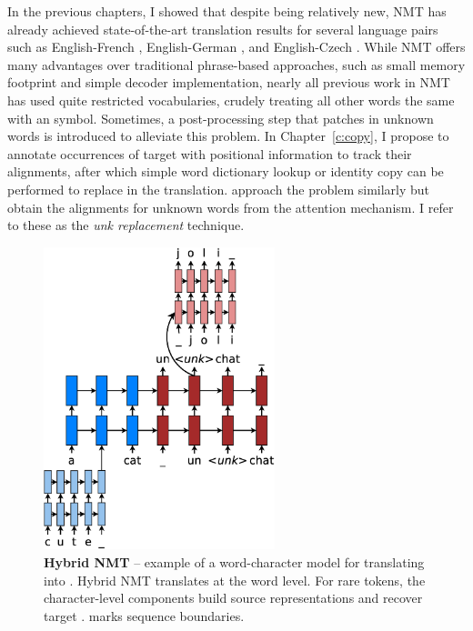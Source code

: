 
\begin{sloppypar}
In the previous chapters, I showed that despite being relatively new, NMT has already
achieved state-of-the-art translation results for several language pairs 
such as English-French \cite{luong15}, English-German
\cite{jean15,luong15attn,luong15iwslt}, and English-Czech \cite{jean15wmt}. 
While NMT offers many advantages over traditional phrase-based approaches, such as
small memory footprint and simple decoder implementation, nearly all previous
work in NMT has used quite restricted vocabularies, crudely treating all other
words the same with an \unk{} symbol. Sometimes, a post-processing step that
patches in unknown words is introduced to alleviate this problem. %
In Chapter~\ref{c:copy}, I propose to annotate occurrences of target \unk{} with positional information to
track their alignments, after which simple word dictionary
lookup or identity copy can be performed to replace \unk{} in the translation.
 approach the problem similarly but obtain the alignments for unknown
words from the attention mechanism. I refer to these as the {\it
unk replacement} technique.
\end{sloppypar}

\begin{figure}%
\centering
\includegraphics[width=0.6\textwidth, clip=true, trim= 0 0 0 0]{img/5-nmt_hybrid}
\caption[Hybrid NMT]{{\bf Hybrid NMT} -- example of a word-character model for translating
 into . Hybrid NMT translates at the word level. For rare tokens,
the character-level components build source representations
and recover target \unk{}. \word{\_} marks sequence
boundaries.}
\label{f:hybrid}
\end{figure}



